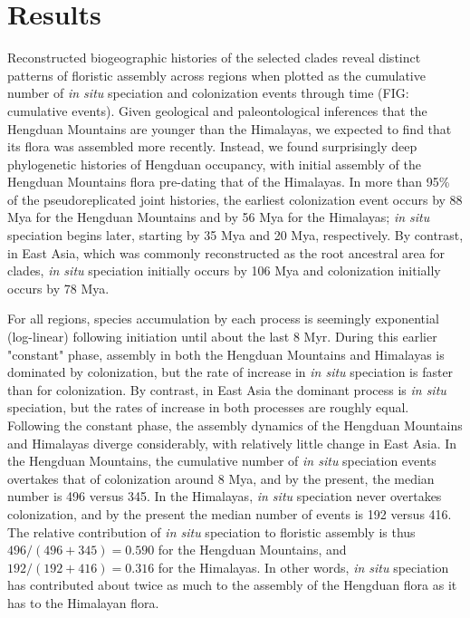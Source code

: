 \section{Results}

Reconstructed biogeographic histories of the selected clades reveal distinct patterns of floristic assembly across regions when plotted as the cumulative number of \textit{in situ} speciation and colonization events through time (FIG: cumulative events). Given geological and paleontological inferences that the Hengduan Mountains are younger than the Himalayas, we expected to find that its flora was assembled more recently. Instead, we found surprisingly deep phylogenetic histories of Hengduan occupancy, with initial assembly of the Hengduan Mountains flora pre-dating that of the Himalayas. In more than 95\% of the pseudoreplicated joint histories, the earliest colonization event occurs by 88 Mya for the Hengduan Mountains and by 56 Mya for the Himalayas; \textit{in situ} speciation begins later, starting by 35 Mya and 20 Mya, respectively. By contrast, in East Asia, which was commonly reconstructed as the root ancestral area for clades, \textit{in situ} speciation initially occurs by 106 Mya and colonization initially occurs by 78 Mya.

For all regions, species accumulation by each process is seemingly exponential (log-linear) following initiation until about the last 8 Myr. During this earlier "constant" phase, assembly in both the Hengduan Mountains and Himalayas is dominated by colonization, but the rate of increase in \textit{in situ} speciation is faster than for colonization. By contrast, in East Asia the dominant process is \textit{in situ} speciation, but the rates of increase in both processes are roughly equal. Following the constant phase, the assembly dynamics of the Hengduan Mountains and Himalayas diverge considerably, with relatively little change in East Asia. In the Hengduan Mountains, the cumulative number of \textit{in situ} speciation events overtakes that of colonization around 8 Mya, and by the present, the median number is 496 versus 345. In the Himalayas, \textit{in situ} speciation never overtakes colonization, and by the present the median number of events is 192 versus 416. The relative contribution of \textit{in situ} speciation to floristic assembly is thus $496/(496+345) = 0.590$ for the Hengduan Mountains, and $192/(192+416) = 0.316$ for the Himalayas. In other words, \textit{in situ} speciation has contributed about twice as much to the assembly of the Hengduan flora as it has to the Himalayan flora.

